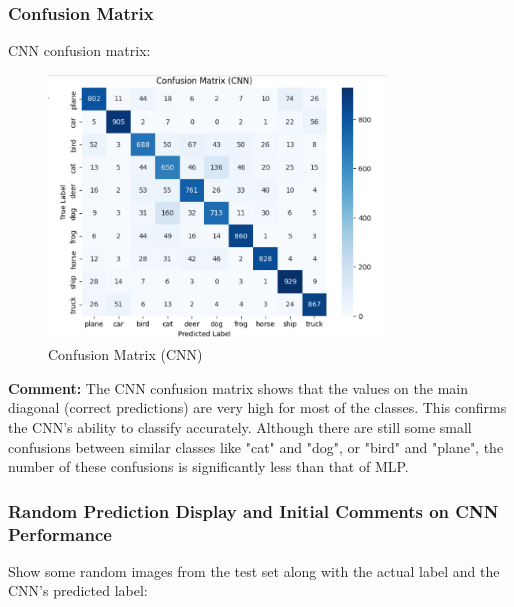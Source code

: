 \documentclass[12pt]{article}
\begin{document}
\subsubsection{Confusion Matrix}
CNN confusion matrix:
\begin{figure}[H]
    \centering
    \includegraphics[width=0.8\textwidth]{Screenshots/Ảnh chụp màn hình 2025-05-23 223731.png} %
    \caption{Confusion Matrix (CNN)}
    \label{fig:cnn_confusion_matrix}
\end{figure}
\textbf{Comment:} The CNN confusion matrix shows that the values on the main diagonal (correct predictions) are very high for most of the classes. This confirms the CNN's ability to classify accurately. Although there are still some small confusions between similar classes like "cat" and "dog", or "bird" and "plane", the number of these confusions is significantly less than that of MLP.

\subsubsection{Random Prediction Display and Initial Comments on CNN Performance}
Show some random images from the test set along with the actual label and the CNN's predicted label:
\end{document}
